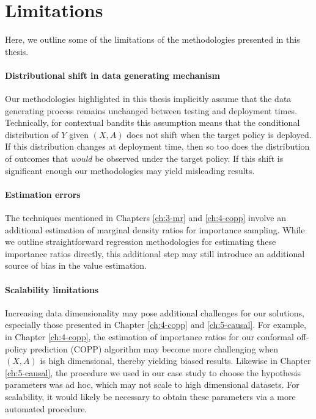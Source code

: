\section{Limitations}
Here, we outline some of the limitations of the methodologies presented in this thesis. 

\paragraph*{Distributional shift in data generating mechanism}
Our methodologies highlighted in this thesis implicitly assume that the data generating process remains unchanged between testing and deployment times. 
Technically, for contextual bandits this assumption means that the conditional distribution of $Y$ given $(X, A)$ does not shift when the target policy is deployed. 
If this distribution changes at deployment time, then so too does the distribution of outcomes that \emph{would} be observed under the target policy. 
If this shift is significant enough our methodologies may yield misleading results.  

\paragraph*{Estimation errors}
The techniques mentioned in Chapters \ref*{ch:3-mr} and \ref*{ch:4-copp} involve an additional estimation of marginal density ratios for importance sampling. 
While we outline straightforward regression methodologies for estimating these importance ratios directly, this additional step may still introduce an additional source of bias in the value estimation. 

\paragraph*{Scalability limitations}
Increasing data dimensionality may pose additional challenges for our solutions, especially those presented in Chapter \ref*{ch:4-copp} and \ref*{ch:5-causal}. 
For example, in Chapter \ref*{ch:4-copp}, the estimation of importance ratios for our conformal off-policy prediction (COPP) algorithm may become more challenging when $(X, A)$ is high dimensional, thereby yielding biased results.
Likewise in Chapter \ref*{ch:5-causal}, the procedure we used in our case study to choose the hypothesis parameters was ad hoc, which may not scale to high dimensional datasets.
For scalability, it would likely be necessary to obtain these parameters via a more automated procedure.

